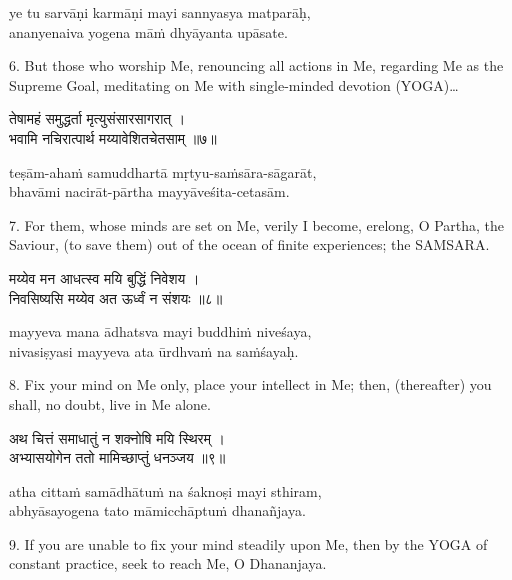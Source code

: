 \begin{transliteration}
ye tu sarvāṇi karmāṇi mayi sannyasya matparāḥ, \\
ananyenaiva yogena māṁ dhyāyanta upāsate.
\end{transliteration}

6. But those who worship Me, renouncing all actions in Me, regarding Me as the
Supreme Goal, meditating on Me with single-minded devotion (YOGA)\ldots

\begin{gitaverse}
तेषामहं समुद्धर्ता मृत्युसंसारसागरात् । \\
भवामि नचिरात्पार्थ मय्यावेशितचेतसाम् ॥७॥
\end{gitaverse}

\begin{transliteration}
teṣām-ahaṁ samuddhartā mṛtyu-saṁsāra-sāgarāt, \\
bhavāmi nacirāt-pārtha mayyāveśita-cetasām.
\end{transliteration}

7. For them, whose minds are set on Me, verily I become, erelong, O Partha, the
Saviour, (to save them) out of the ocean of finite experiences; the SAMSARA.\@

\begin{gitaverse}
मय्येव मन आधत्स्व मयि बुद्धिं निवेशय । \\
निवसिष्यसि मय्येव अत ऊर्ध्वं न संशयः ॥८॥
\end{gitaverse}

\begin{transliteration}
mayyeva mana ādhatsva mayi buddhiṁ niveśaya, \\
nivasiṣyasi mayyeva ata ūrdhvaṁ na saṁśayaḥ.
\end{transliteration}

8. Fix your mind on Me only, place your intellect in Me; then, (thereafter) you
shall, no doubt, live in Me alone.

\begin{gitaverse}
अथ चित्तं समाधातुं न शक्नोषि मयि स्थिरम् । \\
अभ्यासयोगेन ततो मामिच्छाप्तुं धनञ्जय ॥९॥
\end{gitaverse}

\begin{transliteration}
atha cittaṁ samādhātuṁ na śaknoṣi mayi sthiram, \\
abhyāsayogena tato māmicchāptuṁ dhanañjaya.
\end{transliteration}

9. If you are unable to fix your mind steadily upon Me, then by the YOGA of
constant practice, seek to reach Me, O Dhananjaya.

